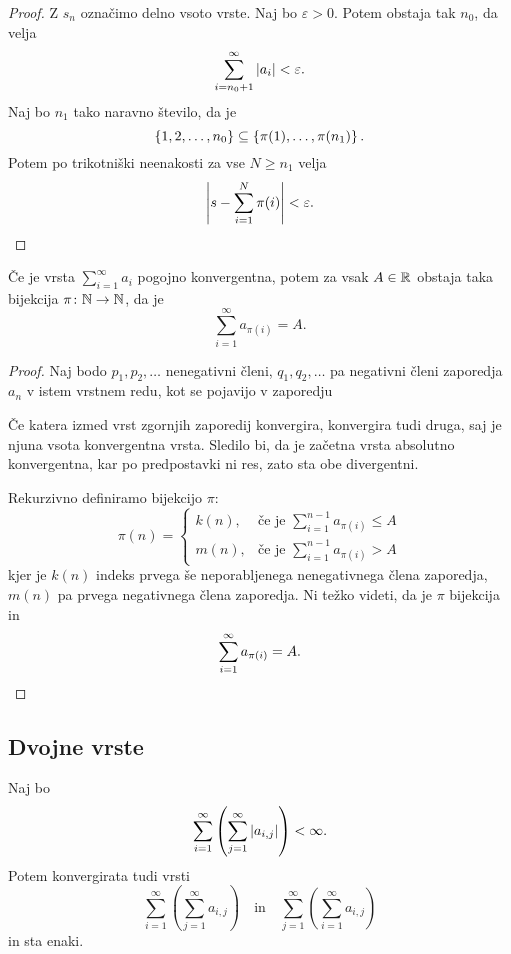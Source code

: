 \documentclass[12pt, a4paper]{article}
\begin{document}
\begin{proof}
Z $s_n$ označimo delno vsoto vrste. Naj bo $\varepsilon>0$. Potem obstaja tak $n_0$, da velja
\[
\sum_{i=n_0+1}^\infty\left\lvert a_i\right\rvert<\varepsilon.
\]
Naj bo $n_1$ tako naravno število, da je
\[
\left\{1,2,\dots,n_0\right\}\subseteq\left\{\pi(1),\dots,\pi(n_1)\right\}.
\]
Potem po trikotniški neenakosti za vse $N\geq n_1$ velja
\[
\left\lvert s-\sum_{i=1}^{N}\pi(i)\right\rvert<\varepsilon.\qedhere
\]
\end{proof}

\begin{izrek}
Če je vrsta $\displaystyle\sum_{i=1}^\infty a_i$ pogojno konvergentna, potem za vsak $A\in\mathbb{R}$ obstaja taka bijekcija $\pi\colon\mathbb{N}\to\mathbb{N}$, da je
\[
\sum_{i=1}^\infty a_{\pi(i)}=A.
\]
\end{izrek}

\begin{proof}
Naj bodo $p_1,p_2,\dots$ nenegativni členi, $q_1,q_2,\dots$ pa negativni členi zaporedja $a_n$ v istem vrstnem redu, kot se pojavijo v zaporedju

Če katera izmed vrst zgornjih zaporedij konvergira, konvergira tudi druga, saj je njuna vsota konvergentna vrsta. Sledilo bi, da je začetna vrsta absolutno konvergentna, kar po predpostavki ni res, zato sta obe divergentni.

Rekurzivno definiramo bijekcijo $\pi$:
\[
\pi(n)=\begin{cases}
k(n), &\text{če je $\displaystyle\sum_{i=1}^{n-1} a_{\pi(i)}\leq A$}
\\
m(n), &\text{če je $\displaystyle\sum_{i=1}^{n-1} a_{\pi(i)}>A$}
\end{cases}
\]
kjer je $k(n)$ indeks prvega še neporabljenega nenegativnega člena zaporedja, $m(n)$ pa prvega negativnega člena zaporedja. Ni težko videti, da je $\pi$ bijekcija in
\[
\sum_{i=1}^\infty a_{\pi(i)}=A.\qedhere
\]
\end{proof}

\newpage

\subsection{Dvojne vrste}

\begin{izrek}[Fubini]
Naj bo
\[
\sum_{i=1}^\infty\left(\sum_{j=1}^\infty\left\lvert a_{i,j}\right\rvert\right)<\infty.
\]
Potem konvergirata tudi vrsti
\[
\sum_{i=1}^\infty\left(\sum_{j=1}^\infty a_{i,j}\right)\quad\text{in}\quad \sum_{j=1}^\infty\left(\sum_{i=1}^\infty a_{i,j}\right)
\]
in sta enaki.
\end{izrek}
\end{document}

